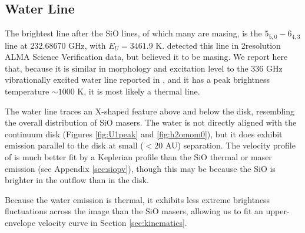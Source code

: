 \documentclass[twocolumn]{aastex61}
\begin{document}
\subsection{Water Line}
The brightest line after the SiO lines, of which many are masing, is the \water
$5_{5,0}-6_{4,3}$ line at 232.68670 GHz, with $E_U=3461.9$ K.
\citet{Hirota2012a} detected this line in 2\arcsec resolution ALMA Science
Verification data, but believed it to be masing.  We report here that, because
it is similar in morphology and excitation level to the 336 GHz vibrationally
excited water line reported in \citet{Hirota2014a}, and it has a peak
brightness temperature $\sim1000$ K, it is most likely a thermal line.

The water line traces an X-shaped feature above and below the disk, resembling
the overall distribution of SiO masers.  The water is not directly aligned with
the continuum disk (Figures \ref{fig:U1peak} and \ref{fig:h2omom0}), but it
does exhibit emission parallel to the disk at small ($<20$ AU) separation.  The velocity profile of
\water is much better fit by a Keplerian profile than the SiO thermal or maser
emission (see Appendix \ref{sec:siopv}), though
this may be because the SiO is brighter in the outflow than in the disk.


Because the water emission is thermal, it exhibits less extreme
brightness fluctuations across the image than the SiO masers, allowing us to
fit an upper-envelope velocity curve in Section \ref{sec:kinematics}.


\end{document}
